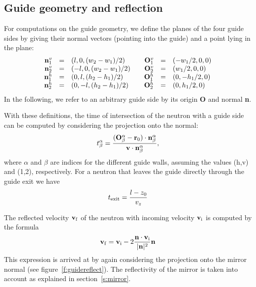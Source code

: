 \subsection{Guide geometry and reflection}
For computations on the guide geometry, we define the planes of the four
guide sides by giving their normal vectors (pointing into the guide)
and a point lying in the plane:
$$
\begin{array}{rclcrcl}
{\bf n}^v_1 &=& (l, 0, {(w_2 - w_1) / 2})
     & & {\bf O}^v_1 &=& (- w_1 / 2, 0, 0) \\
{\bf n}^v_2 &=& (-l, 0, {(w_2 - w_1) / 2})
     & & {\bf O}^v_2 &=& (w_1 / 2, 0, 0) \\
{\bf n}^h_1 &=& (0, l, {(h_2 - h_1) / 2})
     & & {\bf O}^h_1 &=& (0, - h_1 / 2, 0) \\
{\bf n}^h_2 &=& (0, -l, {(h_2 - h_1) / 2})
     & & {\bf O}^h_2 &=& (0, h_1 / 2, 0) \\
\end{array}
$$
In the following, we refer to an arbitrary guide side by its origin
{\bf O} and normal {\bf n}.

With these definitions, the time of intersection of the neutron with a
guide side can be computed by considering the projection onto the
normal:
\begin{equation}
t^\alpha_\beta = \frac{({\bf O}^\alpha_\beta - {\bf r}_0) \cdot {\bf n}^\alpha_\beta}
  {{\bf v} \cdot {\bf n}^\alpha_\beta}  ,
\end{equation}
where $\alpha$ and $\beta$ are indices for the different guide walls,
assuming the values (h,v) and (1,2), respectively.
For a neutron that leaves the guide directly through the guide exit we have
\begin{equation}
t_{\rm exit} = \frac{l - z_0}{v_z}
\end{equation}

The reflected velocity ${\bf v}_{\rm f}$ of the neutron with incoming velocity
${\bf v}_{\rm i}$ is computed by the formula
\begin{equation}
 {\bf v}_{\rm f} =
  {\bf v}_{\rm i}
   - 2{{\bf n} \cdot {\bf v}_{\rm i} \over {|{\bf n}|^2}} {\bf n}
\end{equation}
This expression is arrived at by again considering the projection onto
the mirror normal (see figure~\ref{f:guidereflect}). The reflectivity of the
mirror is taken into account as explained in section~\ref{s:mirror}.

